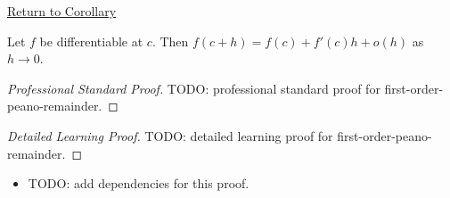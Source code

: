 \newpage
{}
\label{prf:first-order-peano-remainder}

\begin{remark*}[Return]
\hyperref[cor:first-order-peano-remainder]{Return to Corollary}
\end{remark*}

\begin{corollary*}
Let $f$ be differentiable at $c$. Then $f(c+h)=f(c)+f'(c)h+o(h)$ as $h\to 0$.
\end{corollary*}

\begin{proof}[Professional Standard Proof]
\LRAProofBodyStart
TODO: professional standard proof for first-order-peano-remainder.
\end{proof}

\begin{proof}[Detailed Learning Proof]
\LRAProofBodyStart
TODO: detailed learning proof for first-order-peano-remainder.
\end{proof}

\begin{remark*}
\end{remark*}

\begin{dependencies}
\begin{itemize}
  \item TODO: add dependencies for this proof.
\end{itemize}
\end{dependencies}

\clearpage
